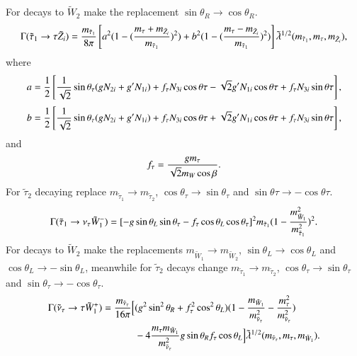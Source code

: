 \documentclass[final,3p,times,pdflatex]{elsarticle}
\begin{document}
For decays to $\tilde{W}_2$ make the replacement $\sin\theta_R \rightarrow \cos\theta_R$.
\begin{equation}\label{stau1tauneut}
\begin{aligned}
\Gamma (\tilde{\tau}_1 \rightarrow \tau \tilde{Z}_i) = {m_{\tilde{\tau}_1} \over 8\pi} \left[a^2 (1- ({m_\tau + m_{\tilde{Z}_i} \over m_{\tilde{\tau}_1}})^2) + b^2 (1- ({m_\tau - m_{\tilde{Z}_i} \over m_{\tilde{\tau}_1}})^2)\right] \tilde{\lambda}^{1/2}(m_{\tilde{\tau}_1}, m_\tau, m_{\tilde{Z}_i}),
\end{aligned}
\end{equation} 
where
\begin{equation}
a = \frac{1}{2}\left[{1 \over \sqrt{2}}\sin\theta_\tau (g N_{2i} + g' N_{1i}) + f_\tau N_{3i} \cos\theta\tau - \sqrt{2} g' N_{1i}\cos\theta\tau + f_\tau N_{3i} \sin\theta\tau\right],
\end{equation}
\begin{equation}
b = \frac{1}{2}\left[{1 \over \sqrt{2}}\sin\theta_\tau (g N_{2i} + g' N_{1i}) + f_\tau N_{3i} \cos\theta\tau + \sqrt{2} g' N_{1i}\cos\theta\tau + f_\tau N_{3i} \sin\theta\tau\right],
\end{equation}
and
\begin{equation} \label{funderscoretau}
f_\tau = {g m_\tau \over \sqrt{2}m_W \cos\beta}.
\end{equation}	
For $\tilde{\tau}_2$ decaying replace $m_{\tilde{\tau}_1} \rightarrow m_{\tilde{\tau}_2}$, $\cos\theta_\tau \rightarrow \sin\theta_\tau$ and $\sin\theta\tau \rightarrow -\cos\theta\tau$.
\begin{equation}\label{stau1nutauch1}
\begin{aligned}
\Gamma (\tilde{\tau}_1 \rightarrow \nu_\tau \tilde{W}_{1}^{-}) = [-g\sin\theta_L\sin\theta_\tau - f_\tau \cos\theta_L\cos\theta_\tau]^2 m_{\tilde{\tau}_1} (1 - {m_{\tilde{W}_1}^2 \over m_{\tilde{\tau}_1}^2})^2.
\end{aligned}
\end{equation} 
For decays to $\tilde{W}_2$ make the replacements $m_{\tilde{W}_1} \rightarrow m_{\tilde{W}_2}$, $\sin\theta_L \rightarrow \cos\theta_L$ and $\cos\theta_L \rightarrow -\sin\theta_L$, meanwhile for $\tilde{\tau}_2$ decays change $m_{\tilde{\tau}_1} \rightarrow m_{\tilde{\tau}_2}$, $\cos\theta_\tau \rightarrow \sin\theta_\tau$ and $\sin\theta_\tau \rightarrow -\cos\theta_\tau$.
\begin{equation}\label{snutautauch1}
\begin{aligned}
\Gamma (\tilde{\nu}_\tau \rightarrow \tau \tilde{W}_{1}^{+}) = {m_{\tilde{\nu}_\tau} \over 16\pi} \Big[& (g^2 \sin^2\theta_R + f_\tau^2 \cos^2\theta_L)(1 - {m_{\tilde{W}_1} \over m_{\tilde{\nu}_\tau}^2} -  {m_{\tau}^2 \over m_{\tilde{\nu}_\tau}^2})  \\ & - 4{m_\tau m_{\tilde{W}_1} \over m_{\tilde{\nu}_\tau}^2} g\sin\theta_R f_\tau \cos\theta_L \Big] \tilde{\lambda}^{1/2} (m_{\tilde{\nu}_\tau}, m_\tau, m_{\tilde{W}_1}).
\end{aligned}
\end{equation} 
\end{document}
